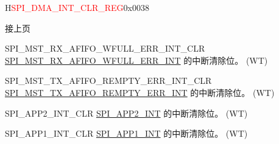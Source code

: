 \addtocounter{Regfloat}{-1}
\begin{register}{H}{\textcolor{red}{SPI\_DMA\_INT\_CLR\_REG}}{0x{}0038}
\begin{regdesc}\begin{reglist}
\item [接上页]
\label{fielddesc:SPIMSTRXAFIFOWFULLERRINTCLR}\item [SPI\_MST\_RX\_AFIFO\_WFULL\_ERR\_INT\_CLR] \hyperref[int:SPIMSTRXAFIFOWFULLERRINT]{SPI\_MST\_RX\_AFIFO\_WFULL\_ERR\_INT} 的中断清除位。 (WT)
\label{fielddesc:SPIMSTTXAFIFOREMPTYERRINTCLR}\item [SPI\_MST\_TX\_AFIFO\_REMPTY\_ERR\_INT\_CLR] \hyperref[int:SPIMSTTXAFIFOREMPTYERRINT]{SPI\_MST\_TX\_AFIFO\_REMPTY\_ERR\_INT} 的中断清除位。 (WT)
\label{fielddesc:SPIAPP2INTCLR}\item [SPI\_APP2\_INT\_CLR] \hyperref[int:SPIAPP2INT]{SPI\_APP2\_INT} 的中断清除位。 (WT)
\label{fielddesc:SPIAPP1INTCLR}\item [SPI\_APP1\_INT\_CLR] \hyperref[int:SPIAPP1INT]{SPI\_APP1\_INT} 的中断清除位。 (WT)
\end{reglist}\end{regdesc}
\end{register}


